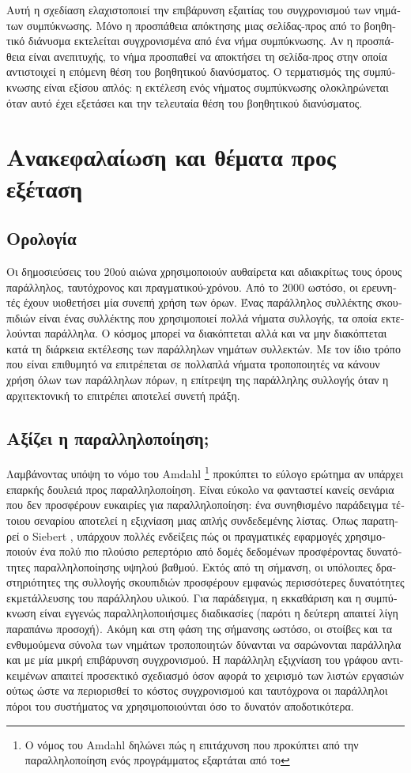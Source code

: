 \begin{greek}
Αυτή η σχεδίαση ελαχιστοποιεί την επιβάρυνση εξαιτίας του συγχρονισμού
των νημάτων συμπύκνωσης. Μόνο η προσπάθεια απόκτησης μιας σελίδας-προς
από το βοηθητικό διάνυσμα εκτελείται συγχρονισμένα από ένα νήμα
συμπύκνωσης. Αν η προσπάθεια είναι ανεπιτυχής, το νήμα προσπαθεί
να αποκτήσει τη σελίδα-προς στην οποία αντιστοιχεί η επόμενη
θέση του βοηθητικού διανύσματος. Ο τερματισμός της συμπύκνωσης
είναι εξίσου απλός: η εκτέλεση ενός νήματος συμπύκνωσης ολοκληρώνεται
όταν αυτό έχει εξετάσει και την τελευταία θέση του βοηθητικού
διανύσματος. 

\section{Ανακεφαλαίωση και θέματα προς εξέταση}
\subsection{Ορολογία}
Οι δημοσιεύσεις του 20ού αιώνα χρησιμοποιούν αυθαίρετα και
αδιακρίτως τους όρους παράλληλος, ταυτόχρονος και πραγματικού-χρόνου.
Από το 2000 ωστόσο, οι ερευνητές έχουν υιοθετήσει μία συνεπή
χρήση των όρων. Ένας παράλληλος συλλέκτης σκουπιδιών είναι ένας
συλλέκτης που χρησιμοποιεί πολλά νήματα συλλογής, τα οποία
εκτελούνται παράλληλα. Ο κόσμος μπορεί να διακόπτεται αλλά και
να μην διακόπτεται κατά τη διάρκεια εκτέλεσης των παράλληλων
νημάτων συλλεκτών. Με τον ίδιο τρόπο που είναι επιθυμητό να
επιτρέπεται σε πολλαπλά νήματα τροποποιητές να κάνουν χρήση
όλων των παράλληλων πόρων, η επίτρεψη της παράλληλης συλλογής
όταν η αρχιτεκτονική το επιτρέπει αποτελεί συνετή πράξη.

\subsection{Αξίζει η παραλληλοποίηση;}
Λαμβάνοντας υπόψη το νόμο του Amdahl \footnote{Ο νόμος του Amdahl
δηλώνει πώς η επιτάχυνση που προκύπτει από την παραλληλοποίηση
ενός προγράμματος εξαρτάται από το} προκύπτει το εύλογο ερώτημα
αν υπάρχει επαρκής δουλειά προς παραλληλοποίηση. Είναι εύκολο
να φανταστεί κανείς σενάρια που δεν προσφέρουν ευκαιρίες για
παραλληλοποίηση: ένα συνηθισμένο παράδειγμα τέτοιου σεναρίου
αποτελεί η εξιχνίαση μιας απλής συνδεδεμένης λίστας. Όπως
παρατηρεί ο Siebert \cite{DBLP:conf/iwmm/Siebert08}, υπάρχουν
πολλές ενδείξεις πώς οι πραγματικές εφαρμογές χρησιμοποιούν
ένα πολύ πιο πλούσιο ρεπερτόριο από δομές δεδομένων προσφέροντας
δυνατότητες παραλληλοποίησης υψηλού βαθμού. Εκτός από τη σήμανση,
οι υπόλοιπες δραστηριότητες της συλλογής σκουπιδιών προσφέρουν
εμφανώς περισσότερες δυνατότητες εκμετάλλευσης του παράλληλου
υλικού. Για παράδειγμα, η εκκαθάριση και η συμπύκνωση είναι
εγγενώς παραλληλοποιήσιμες διαδικασίες (παρότι η δεύτερη απαιτεί
λίγη παραπάνω προσοχή). Ακόμη και στη φάση της σήμανσης ωστόσο,
οι στοίβες και τα ενθυμούμενα σύνολα των νημάτων τροποποιητών
δύνανται να σαρώνονται παράλληλα και με μία μικρή επιβάρυνση
συγχρονισμού. Η παράλληλη εξιχνίαση του γράφου αντικειμένων
απαιτεί προσεκτικό σχεδιασμό όσον αφορά το χειρισμό των λιστών
εργασιών ούτως ώστε να περιορισθεί το κόστος συγχρονισμού και
ταυτόχρονα οι παράλληλοι πόροι του συστήματος να χρησιμοποιούνται
όσο το δυνατόν αποδοτικότερα.


\end{greek}
